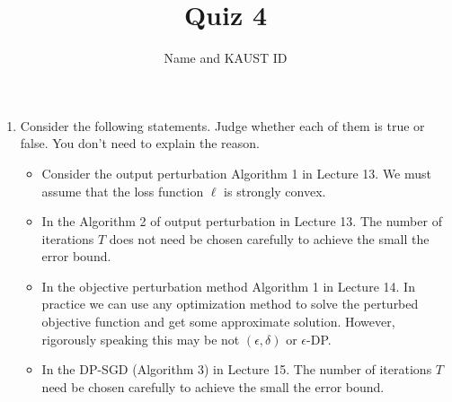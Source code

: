 \documentclass[11pt]{article}
\begin{document}
\author{Name and KAUST ID}
\title{Quiz 4}
\maketitle

\medskip

\begin{enumerate}

\item Consider the following statements. Judge whether each of them is true or false. You don’t need to explain the reason.
\begin{itemize}

\item Consider the output perturbation Algorithm 1 in Lecture 13. We must assume that the loss function $\ell$ is strongly convex. 
\item In the Algorithm 2 of output perturbation in Lecture 13. The number of iterations $T$ does not need  be chosen carefully to achieve the small the error bound. 
\item In the objective perturbation method Algorithm 1 in Lecture 14. In practice we can use any optimization method to solve the perturbed objective function and get some approximate solution. However,  rigorously speaking this may be not $(\epsilon, \delta)$ or $\epsilon$-DP.  
\item In the DP-SGD (Algorithm 3) in Lecture 15. The number of iterations $T$  need  be chosen carefully to achieve the small the error bound. 

\end{itemize}

\end{enumerate}
 
\end{document}
